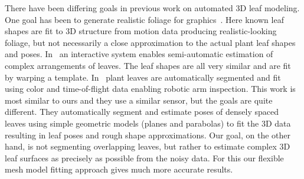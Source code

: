 There have been differing goals in previous work on automated $3$D leaf modeling.   One goal has been to generate realistic foliage for graphics~\cite{Bradley:2013}.  Here known leaf shapes are fit to $3$D structure from motion data producing realistic-looking foliage, but not necessarily a close approximation to the actual plant leaf shapes and poses.  In~\cite{Quan:2006} an interactive system enables semi-automatic estimation of complex arrangements of leaves.  The leaf shapes are all very similar and are fit by warping a template.  In~\cite{Alenya2011,Alenya2013} plant leaves are automatically segmented and fit using color and time-of-flight data enabling robotic arm inspection.  This work is most similar to ours and they use a similar sensor, but the goals are quite different.  They automatically segment and estimate poses of densely spaced leaves using simple geometric models (planes and parabolas) to fit the 3D data resulting in leaf poses and rough shape approximations.  Our goal, on the other hand, is not segmenting overlapping leaves, but rather to estimate complex $3$D leaf surfaces as precisely as possible from the noisy data.  For this our flexible mesh model fitting approach gives much more accurate results.





